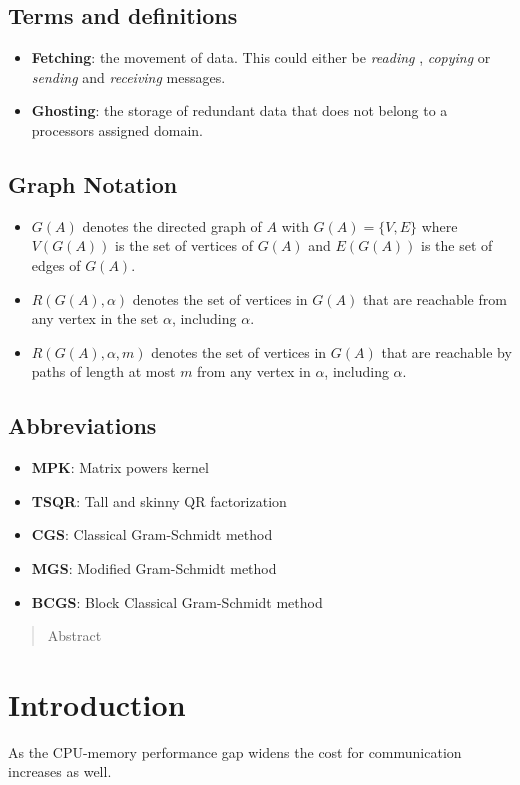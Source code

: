 \documentclass{scrartcl}
\numberwithin{equation}{section}
\begin{document}
\subsection*{Terms and definitions}
\begin{itemize}
\item \textbf{Fetching}: the movement of data. This could either be \textit{reading} , \textit{copying} or \textit{sending} and \textit{receiving} messages.
\item \textbf{Ghosting}: the storage of redundant data that does not belong to a processors assigned domain.
\end{itemize}
\subsection*{Graph Notation}
\begin{itemize}
\item $G(A)$ denotes the directed graph of $A$ with $G(A) = \{V,E\}$ where $V(G(A))$ is the set of vertices of $G(A)$ and $E(G(A))$ is the set of edges of $G(A)$.
\item $R(G(A), \alpha)$ denotes the set of vertices in $G(A)$ that are reachable from any vertex in the set $\alpha$, including $\alpha$.
\item $R(G(A), \alpha, m)$ denotes the set of vertices in $G(A)$ that are reachable by paths of length at most $m$ from any vertex in $\alpha$, including $\alpha$.
\end{itemize}
\subsection*{Abbreviations}
\begin{itemize}
\item \textbf{MPK}: Matrix powers kernel
\item \textbf{TSQR}: Tall and skinny QR factorization
\item \textbf{CGS}: Classical Gram-Schmidt method
\item \textbf{MGS}: Modified Gram-Schmidt method
\item \textbf{BCGS}: Block Classical Gram-Schmidt method
\end{itemize}
\pagebreak

\begin{abstract}
Abstract
\end{abstract}
\section{Introduction}
As the CPU-memory performance gap widens the cost for communication increases as well.
\end{document}
